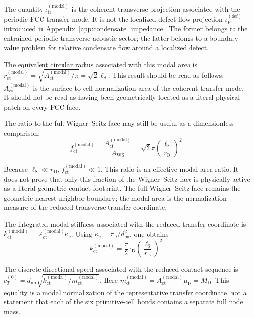 The quantity \(\iota_{\mathrm{tr}}^{(\mathrm{modal})}\) is the coherent transverse projection associated with the periodic FCC transfer mode. It is not the localized defect-flow projection \(\iota_V^{(\mathrm{def})}\) introduced in Appendix~\ref{app:condensate_impedance}. The former belongs to the entrained periodic transverse acoustic sector; the latter belongs to a boundary-value problem for relative condensate flow around a localized defect.

The equivalent circular radius associated with this modal area is $r_{\mathrm{ct}}^{(\mathrm{modal})} = \sqrt{A_{\mathrm{ct}}^{(\mathrm{modal})} / \pi} = \sqrt{2}\ell_{\mathrm{S}}$. This result should be read as follows: $A_{\mathrm{ct}}^{(\mathrm{modal})}$ is the surface-to-cell normalization area of the coherent transfer mode. It should not be read as having been geometrically located as a literal physical patch on every FCC face.

The ratio to the full Wigner–Seitz face may still be useful as a dimensionless comparison:
\begin{equation}
    f_{\mathrm{ct}}^{(\mathrm{modal})} = \frac{A_{\mathrm{ct}}^{(\mathrm{modal})}}{A_{\mathrm{WS}}} = \sqrt{2}\pi \left(\frac{\ell_{\mathrm{S}}}{r_{\mathrm{D}}}\right)^2.
\end{equation}

Because $\ell_{\mathrm{S}}\ll r_{\mathrm{D}}$, $f_{\mathrm{ct}}^{(\mathrm{modal})}\ll1$. This ratio is an effective modal-area ratio. It does not prove that only this fraction of the Wigner–Seitz face is physically active as a literal geometric contact footprint. The full Wigner–Seitz face remains the geometric nearest-neighbor boundary; the modal area is the normalization measure of the reduced transverse transfer coordinate.

The integrated modal stiffness associated with the reduced transfer coordinate is $k_{\mathrm{ct}}^{(\mathrm{modal})} = A_{\mathrm{ct}}^{(\mathrm{modal})} \kappa_{\mathrm{c}}$. Using $\kappa_{\mathrm{c}} = \tau_{\mathrm{D}} / d_{\mathrm{nn}}^2$, one obtains
\begin{equation}
    k_{\mathrm{ct}}^{(\mathrm{modal})} = \frac{\pi}{2} \tau_{\mathrm{D}} \left(\frac{\ell_{\mathrm{S}}}{r_{\mathrm{D}}}\right)^2.
\end{equation}

The discrete directional speed associated with the reduced contact sequence is $c_T^{(0)} = d_{\mathrm{nn}} \sqrt{ k_{\mathrm{ct}}^{(\mathrm{modal})} / m_{\mathrm{ct}}^{(\mathrm{modal})} }$. Here $m_{\mathrm{ct}}^{(\mathrm{modal})} = A_{\mathrm{ct}}^{(\mathrm{modal})}\mu_{\mathrm{D}} = M_{\mathrm{D}}$. This equality is a modal normalization of the representative transfer coordinate, not a statement that each of the six primitive-cell bonds contains a separate full node mass.

